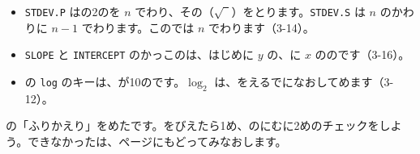 \begin{itemize}[leftmargin=1.4\zw, itemsep=2pt, topsep=4pt, label={\color{\bkTT}●}]
\item \texttt{STDEV.P} はの2のを $n$ でわり、その（$\sqrt{\phantom{0}}$）をとります。\texttt{STDEV.S} は $n$ のかわりに $n-1$ でわります。このでは $n$ でわります（3-14）。
\item \texttt{SLOPE} と \texttt{INTERCEPT} のかっこのは、はじめに $y$ の、に $x$ ののです（3-16）。
\item {}の \texttt{log} のキーは、が10のです。$\log_2$ は、をえるでになおしてめます（3-12）。
\end{itemize}

{\small {}の「ふりかえり」をめたです。をびえたら1め、のにむに2めのチェックをしよう。できなかったは、ページにもどってみなおします。}\par\vspace{2mm}


